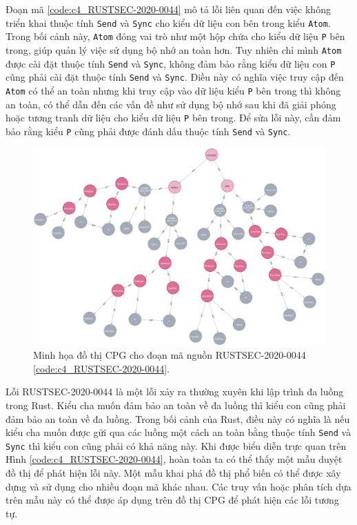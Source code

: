 Đoạn mã \ref{code:c4_RUSTSEC-2020-0044} mô tả lỗi liên quan đến việc không triển khai thuộc tính \texttt{Send} và \texttt{Sync} cho kiểu dữ liệu con bên trong kiểu \texttt{Atom}.
Trong bối cảnh này, \texttt{Atom} đóng vai trò như một hộp chứa cho kiểu dữ liệu \texttt{P} bên trong, giúp quản lý việc sử dụng bộ nhớ an toàn hơn.
Tuy nhiên chỉ mình \texttt{Atom} được cài đặt thuộc tính \texttt{Send} và \texttt{Sync}, không đảm bảo rằng kiểu dữ liệu con \texttt{P} cũng phải cài đặt thuộc tính \texttt{Send} và \texttt{Sync}.
Điều này có nghĩa việc truy cập đến \texttt{Atom} có thể an toàn nhưng khi truy cập vào dữ liệu kiểu \texttt{P} bên trong thì không an toàn, có thể dẫn đến các vấn đề như sử dụng bộ nhớ sau khi đã giải phóng hoặc tương tranh dữ liệu cho kiểu dữ liệu \texttt{P} bên trong.
Để sửa lỗi này, cần đảm bảo rằng kiểu \texttt{P} cũng phải được đánh dấu thuộc tính \texttt{Send} và \texttt{Sync}.

\begin{figure}[H]
    \includegraphics[width=1\columnwidth]{figures/c4/c4_RUSTSEC-2020-0044.png}
    \centering
    \caption{Minh họa đồ thị CPG cho đoạn mã nguồn RUSTSEC-2020-0044 \ref{code:c4_RUSTSEC-2020-0044}.}
    \label{img:c4_RUSTSEC-2020-0044}
\end{figure}

Lỗi RUSTSEC-2020-0044 là một lỗi xảy ra thường xuyên khi lập trình đa luồng trong Rust.
Kiểu cha muốn đảm bảo an toàn về đa luồng thì kiểu con cũng phải đảm bảo an toàn về đa luồng.
Trong bối cảnh của Rust, điều này có nghĩa là nếu kiểu cha muốn được gửi qua các luồng một cách an toàn bằng thuộc tính \texttt{Send} và \texttt{Sync} thì kiểu con cũng phải có khả năng này.
Khi được biểu diễn trực quan trên Hình \ref{code:c4_RUSTSEC-2020-0044}, hoàn toàn ta có thể thấy một mẫu duyệt đồ thị để phát hiện lỗi này.
Một mẫu khai phá đồ thị phổ biến có thể được xây dựng và sử dụng cho nhiều đoạn mã khác nhau.
Các truy vấn hoặc phân tích dựa trên mẫu này có thể được áp dụng trên đồ thị CPG để phát hiện các lỗi tương tự.

